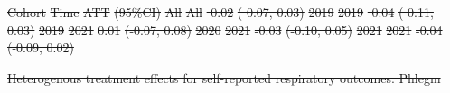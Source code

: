 \documentclass[
  letterpaper,
  DIV=11,
  numbers=noendperiod]{scrartcl}
\makeatletter
\renewenvironment{table}%
   {\renewcommand\familydefault\sfdefault
    \@float{table}}
   {\end@float}
\providecommand{\DIFdeltex}[1]{{\protect\color{red}\sout{#1}}}                      %
\providecommand{\DIFdelFL}[1]{\DIFdel{#1}} %
\providecommand{\DIFdel}[1]{\texorpdfstring{\DIFdeltex{#1}}{}} %
\makeatother
\begin{document}
\DIFdelFL{Cohort }%
\DIFdelFL{Time }%
\DIFdelFL{ATT }%
\DIFdelFL{(95\%CI)}%
\DIFdelFL{All }%
\DIFdelFL{All }%
\DIFdelFL{-0.02 }%
\DIFdelFL{(-0.07, 0.03)}%
\DIFdelFL{2019 }%
\DIFdelFL{2019 }%
\DIFdelFL{-0.04 }%
\DIFdelFL{(-0.11, 0.03)}%
\DIFdelFL{2019 }%
\DIFdelFL{2021 }%
\DIFdelFL{0.01 }%
\DIFdelFL{(-0.07, 0.08)}%
\DIFdelFL{2020 }%
\DIFdelFL{2021 }%
\DIFdelFL{-0.03 }%
\DIFdelFL{(-0.10, 0.05)}%
\DIFdelFL{2021 }%
\DIFdelFL{2021 }%
\DIFdelFL{-0.04 }%
\DIFdelFL{(-0.09, 0.02)}%

{%
\DIFdelFL{Heterogenous treatment effects for self-reported respiratory outcomes:
Phlegm }}%
\end{document}
